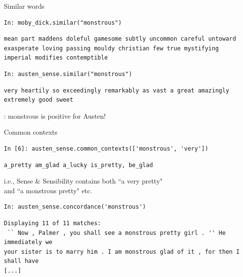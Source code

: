 \documentclass[aspectratio=169,usenames,dvipsnames]{beamer}
\begin{document}
\begin{frame}[fragile]{Similar words}
\begin{lstlisting}
In: moby_dick.similar("monstrous")
\end{lstlisting}
\begin{lstlisting}[style=plain]
mean part maddens doleful gamesome subtly uncommon careful untoward
exasperate loving passing mouldy christian few true mystifying
imperial modifies contemptible
\end{lstlisting}
\begin{lstlisting}
In: austen_sense.similar("monstrous")
\end{lstlisting}
\begin{lstlisting}[style=plain]
very heartily so exceedingly remarkably as vast a great amazingly
extremely good sweet
\end{lstlisting}

: monstrous is positive for Austen!
\end{frame}

\begin{frame}[fragile]{Common contexts}
\begin{lstlisting}
In [6]: austen_sense.common_contexts(['monstrous', 'very'])
\end{lstlisting}
\begin{lstlisting}[style=plain]
a_pretty am_glad a_lucky is_pretty, be_glad
\end{lstlisting}

\pause
i.e., Sense \& Sensibility contains both ``a very pretty" \\
    and ``a monstrous pretty" etc.

\begin{lstlisting}
In: austen_sense.concordance('monstrous')
\end{lstlisting}
\begin{lstlisting}[style=plain]
Displaying 11 of 11 matches:
 `` Now , Palmer , you shall see a monstrous pretty girl . '' He immediately we
your sister is to marry him . I am monstrous glad of it , for then I shall have
[...]
\end{lstlisting}
\end{frame}
\end{document}
